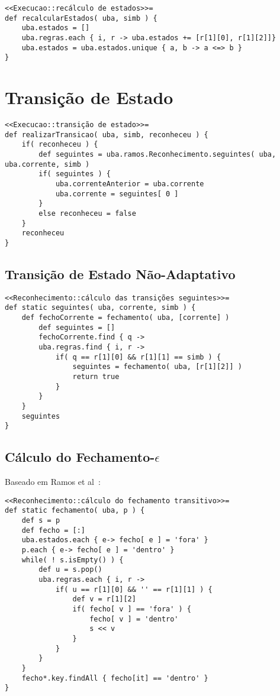 \begin{lstlisting}
<<Execucao::recálculo de estados>>=
def recalcularEstados( uba, simb ) {
    uba.estados = []
    uba.regras.each { i, r -> uba.estados += [r[1][0], r[1][2]]}
    uba.estados = uba.estados.unique { a, b -> a <=> b }
}
\end{lstlisting}

\section{Transição de Estado}
\label{sec:isv:execucao-transicao}

\begin{lstlisting}
<<Execucao::transição de estado>>=
def realizarTransicao( uba, simb, reconheceu ) {
    if( reconheceu ) {
        def seguintes = uba.ramos.Reconhecimento.seguintes( uba, uba.corrente, simb )
        if( seguintes ) {
            uba.correnteAnterior = uba.corrente
            uba.corrente = seguintes[ 0 ]
        }
        else reconheceu = false
    }
    reconheceu
}
\end{lstlisting}

\subsection{Transição de Estado Não-Adaptativo}

\begin{lstlisting}
<<Reconhecimento::cálculo das transições seguintes>>=
def static seguintes( uba, corrente, simb ) {
    def fechoCorrente = fechamento( uba, [corrente] )
        def seguintes = []
        fechoCorrente.find { q ->
        uba.regras.find { i, r ->
            if( q == r[1][0] && r[1][1] == simb ) {
                seguintes = fechamento( uba, [r[1][2]] )
                return true
            }
        }
    }
    seguintes
}
\end{lstlisting}

\subsection{Cálculo do Fechamento-$\epsilon$}

Baseado em Ramos et al~\cite{ramos:2009:lftmi}:

\begin{lstlisting}
<<Reconhecimento::cálculo do fechamento transitivo>>=
def static fechamento( uba, p ) {
    def s = p
    def fecho = [:]
    uba.estados.each { e-> fecho[ e ] = 'fora' }
    p.each { e-> fecho[ e ] = 'dentro' }
    while( ! s.isEmpty() ) {
        def u = s.pop()
        uba.regras.each { i, r ->
            if( u == r[1][0] && '' == r[1][1] ) {
                def v = r[1][2]
                if( fecho[ v ] == 'fora' ) {
                    fecho[ v ] = 'dentro'
                    s << v
                }
            }
        }
    }
    fecho*.key.findAll { fecho[it] == 'dentro' }
}
\end{lstlisting}



